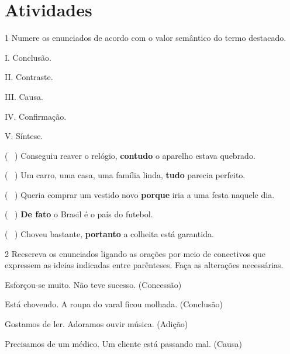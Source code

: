 \section*{Atividades}

\num{1} Numere os enunciados de acordo com o valor semântico do termo
destacado.

\begin{multicols}{2}
I. Conclusão.

II. Contraste. 

III. Causa.

IV. Confirmação. 

V. Síntese. 


\columnbreak

(~ ) Conseguiu reaver o relógio, \textbf{contudo} o aparelho
estava quebrado. 

(~ ) Um carro, uma casa, uma família linda, \textbf{tudo} parecia perfeito. 

(~ ) Queria comprar um vestido novo \textbf{porque} iria a uma
festa naquele dia. 

(~ ) \textbf{De fato} o Brasil é o país do futebol.

(~ ) Choveu bastante, \textbf{portanto} a colheita está garantida.
\end{multicols}

\num{2} Reescreva os enunciados ligando as orações por meio de
conectivos que expressem as ideias indicadas entre parênteses. Faça as
alterações necessárias.

\begin{escolha}
\item Esforçou-se muito. Não teve sucesso. (Concessão)


\item Está chovendo. A roupa do varal ficou molhada. (Conclusão)


\item Gostamos de ler. Adoramos ouvir música. (Adição)


\item Precisamos de um médico. Um cliente está passando mal. (Causa)

\end{escolha}


